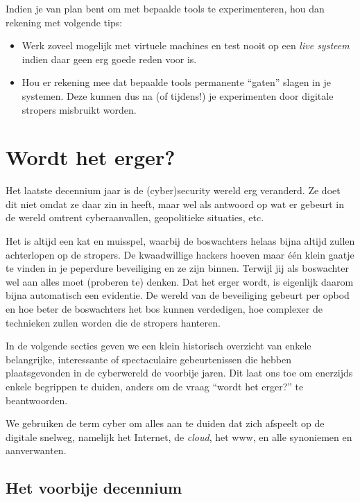 \documentclass[
  10pt,
  dutch,
  paper=a4,
  ,captions=tableheading
]{scrbook}
\providecommand{\tightlist}{%
  \setlength{\itemsep}{0pt}\setlength{\parskip}{0pt}}
\begin{document}
Indien je van plan bent om met bepaalde tools te experimenteren, hou dan
rekening met volgende tips:

\begin{itemize}
\tightlist
\item
  Werk zoveel mogelijk met virtuele machines en test nooit op een
  \emph{live systeem} indien daar geen erg goede reden voor is.
\item
  Hou er rekening mee dat bepaalde tools permanente ``gaten'' slagen in
  je systemen. Deze kunnen dus na (of tijdens!) je experimenten door
  digitale stropers misbruikt worden.
\end{itemize}

\chapter{Wordt het erger?}\label{wordt-het-erger}

Het laatste decennium jaar is de (cyber)security wereld erg veranderd.
Ze doet dit niet omdat ze daar zin in heeft, maar wel als antwoord op
wat er gebeurt in de wereld omtrent cyberaanvallen, geopolitieke
situaties, etc.

Het is altijd een kat en muisspel, waarbij de boswachters helaas bijna
altijd zullen achterlopen op de stropers. De kwaadwillige hackers hoeven
maar één klein gaatje te vinden in je peperdure beveiliging en ze zijn
binnen. Terwijl jij als boswachter wel aan alles moet (proberen te)
denken. Dat het erger wordt, is eigenlijk daarom bijna automatisch een
evidentie. De wereld van de beveiliging gebeurt per opbod en hoe beter
de boswachters het bos kunnen verdedigen, hoe complexer de technieken
zullen worden die de stropers hanteren.

In de volgende secties geven we een klein historisch overzicht van
enkele belangrijke, interessante of spectaculaire gebeurtenissen die
hebben plaatsgevonden in de cyberwereld de voorbije jaren. Dit laat ons
toe om enerzijds enkele begrippen te duiden, anders om de vraag ``wordt
het erger?'' te beantwoorden.

\begin{noteblock}
We gebruiken de term cyber om alles aan te duiden dat zich afspeelt op
de digitale snelweg, namelijk het Internet, de \emph{cloud}, het www, en
alle synoniemen en aanverwanten.
\end{noteblock}

\section{Het voorbije decennium}\label{het-voorbije-decennium}
\end{document}
